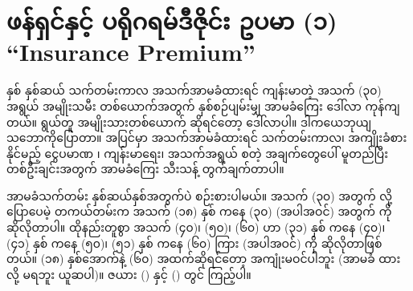 \section{ဖန်ရှင်နှင့် ပရိုဂရမ်ဒီဇိုင်း ဥပမာ (၁) “Insurance Premium”}
နှစ် နှစ်ဆယ် သက်တမ်းကာလ  အသက်အာမခံထားရင် ကျန်းမာတဲ့ အသက် (၃၀) အရွယ် အမျိုးသမီး တစ်ယောက်အတွက် နှစ်စဉ်ပျမ်းမျှ အာမခံကြေး   ဒေါ်လာ ကုန်ကျတယ်။ ရွယ်တူ အမျိုးသားတစ်ယောက် ဆိုရင်တော့  ဒေါ်လာပါ။ ဒါကယေဘုယျ သဘောကိုပြောတာ။ အပြင်မှာ အသက်အာမခံထားရင် သက်\allowbreak တမ်းကာလ၊ အကျိုးခံစားနိုင်မည့် ငွေပမာဏ ၊ ကျန်းမာရေး၊ အသက်အရွယ်  စတဲ့ အချက်တွေပေါ် မူတည်ပြီး တစ်ဦးချင်းအတွက် အာမခံကြေး သီးသန့် တွက်ချက်တာပါ။

အာမခံသက်တမ်း နှစ်ဆယ်နှစ်အတွက်ပဲ စဉ်းစားပါမယ်။ အသက် (၃၀) အတွက်  လို့ပြောပေမဲ့ တကယ်တမ်းက အသက် (၁၈) နှစ် ကနေ (၃၀) (အပါအဝင်) အတွက်  ကို ဆိုလိုတာပါ။ ထိုနည်းတူစွာ အသက် (၄၀)၊ (၅၀)၊ (၆၀)  ဟာ (၃၁) နှစ် ကနေ (၄၀)၊ (၄၁) နှစ် ကနေ (၅၀)၊ (၅၁) နှစ် ကနေ (၆၀) ကြား (အပါအဝင်) ကို ဆိုလိုတာဖြစ်တယ်။ (၁၈) နှစ်အောက်နဲ့ (၆၀) အထက်ဆိုရင်တော့ အကျုံးမဝင်ပါဘူး (အာမခံ ထားလို့ မရဘူး ယူဆပါ)။ ဇယား (\fRefNo{\ref{tbl:premiumF}}) နှင့် (\fRefNo{\ref{tbl:premiumM}}) တွင် ကြည့်ပါ။

